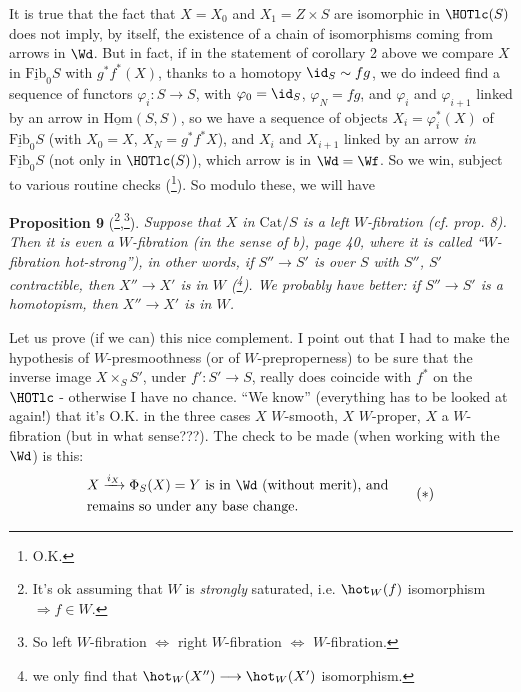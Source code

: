 It is true that the fact that $X = X_0$ and $X_1 = Z \times S$ are isomorphic in $\HOTlc(S)$ does not imply, by itself, the existence of a  chain of isomorphisms coming from arrows in $\Wd$. But in fact, if in the statement of corollary 2 above we compare $X$ in $\underline{\mathrm{Fib}}_0S$ with $g^*f^*(X)$, thanks to a homotopy $\id_S \sim fg$, we do indeed find a sequence of functors $\varphi_i : S \longrightarrow S$, with $\varphi_0 = \id_S$, $\varphi_N = fg$, and $\varphi_i$ and $\varphi_{i+1}$ linked by an arrow in $\underline{\mathrm{Hom}}(S,S)$, so we have a sequence of objects $X_i = \varphi_i^*(X)$ of $\underline{\mathrm{Fib}}_0S$ (with $X_0 = X$, $X_N = g^*f^*X$), and $X_i$ and $X_{i+1}$ linked by an arrow \textit{in} $\underline{\mathrm{Fib}}_0S$ (not only in $\HOTlc(S)$), which arrow is in $\Wd = \Wf$. So we win, subject to various routine checks (\footnote[55]{O.K.}). So modulo these, we will have

\textbf{Proposition 9} (\footnote[56]{It's ok assuming that $W$ is \textit{strongly} saturated, i.e. $\hot_W(f)$ isomorphism $\Longrightarrow f \in W$.},\footnote[57]{So left $W$-fibration $\Longleftrightarrow$ right $W$-fibration $\Longleftrightarrow$ $W$-fibration.}). \textit{Suppose that $X$ in $\mathrm{Cat}/S$ is a left $W$-fibration (cf. prop. 8). Then it is even a $W$-fibration (in the sense of b), page 40, where it is called ``$W$-fibration \textup{hot}-strong''), in other words, if $S'' \longrightarrow S'$ is over $S$ with $S''$, $S'$ contractible, then $X'' \longrightarrow X'$ is in $W$ (\footnote[58]{we only find that $\hot_W(X'') \longrightarrow \hot_W(X')$ isomorphism.}). We probably have better: if $S'' \longrightarrow S'$ is a homotopism, then $X'' \longrightarrow X'$ is in $W$.}

Let us prove (if we can) this nice complement. I point out that I had to make the hypothesis of $W$-presmoothness (or of $W$-preproperness) to be sure that the inverse image $X \times_S S'$, under $f' : S' \longrightarrow S$, really does coincide with $f^*$ on the $\HOTlc$ - otherwise I have no chance. %
``We know'' (everything has to be looked at again!) that it's O.K. in the three cases $X$ $W$-smooth, $X$ $W$-proper, $X$ a $W$-fibration (but in what sense???). The check to be made (when working with the $\Wd$) is this:
\[ \begin{aligned}
&X \xrightarrow{i_X} \Phi_S(X) = Y \text{ is in } \Wd \text{ (without merit), and} \\
&\text{remains so under any base change.}
\end{aligned} \tag*{$(*)$} \]


